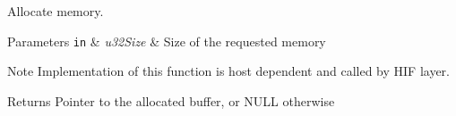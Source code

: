 Allocate memory. 


\begin{DoxyParams}[1]{Parameters}
\mbox{\tt in}  & {\em u32\+Size} & Size of the requested memory \\
\hline
\end{DoxyParams}
\begin{DoxyNote}{Note}
Implementation of this function is host dependent and called by H\+IF layer. 
\end{DoxyNote}
\begin{DoxyReturn}{Returns}
Pointer to the allocated buffer, or N\+U\+LL otherwise 
\end{DoxyReturn}
